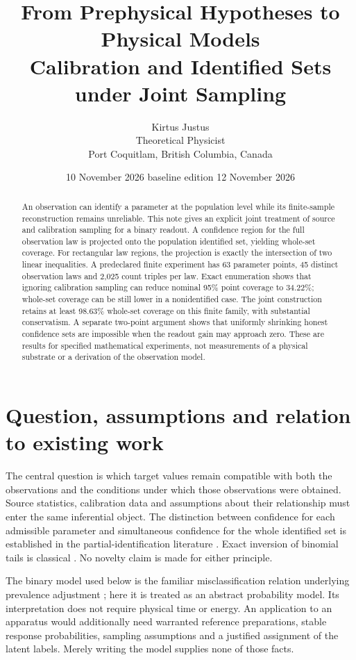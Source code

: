 \documentclass[11pt,a4paper]{article}
\title{\color{ink}\sffamily\large From Prephysical Hypotheses to Physical Models\\[9pt]\LARGE Calibration and Identified Sets under Joint Sampling}
\author{Kirtus Justus\\\small Theoretical Physicist\\\small Port Coquitlam, British Columbia, Canada}
\date{10 November 2026 \textperiodcentered{} baseline edition 12 November 2026}
\theoremstyle{definition}\newtheorem{definition}[theorem]{Definition}
\begin{document}
\maketitle
\begin{abstract}
An observation can identify a parameter at the population level while its finite-sample reconstruction remains unreliable. This note gives an explicit joint treatment of source and calibration sampling for a binary readout. A confidence region for the full observation law is projected onto the population identified set, yielding whole-set coverage. For rectangular law regions, the projection is exactly the intersection of two linear inequalities. A predeclared finite experiment has 63 parameter points, 45 distinct observation laws and 2,025 count triples per law. Exact enumeration shows that ignoring calibration sampling can reduce nominal 95\% point coverage to 34.22\%; whole-set coverage can be still lower in a nonidentified case. The joint construction retains at least 98.63\% whole-set coverage on this finite family, with substantial conservatism. A separate two-point argument shows that uniformly shrinking honest confidence sets are impossible when the readout gain may approach zero. These are results for specified mathematical experiments, not measurements of a physical substrate or a derivation of the observation model.
\end{abstract}
\begingroup
\setlength{\parskip}{0pt}
\tableofcontents
\endgroup
\newpage
\section{Question, assumptions and relation to existing work}

The central question is which target values remain compatible with both the observations and the conditions under which those observations were obtained. Source statistics, calibration data and assumptions about their relationship must enter the same inferential object. The distinction between confidence for each admissible parameter and simultaneous confidence for the whole identified set is established in the partial-identification literature \cite{imbens,romano}. Exact inversion of binomial tails is classical \cite{clopper}. No novelty claim is made for either principle.

The binary model used below is the familiar misclassification relation underlying prevalence adjustment \cite{rogan}; here it is treated as an abstract probability model. Its interpretation does not require physical time or energy. An application to an apparatus would additionally need warranted reference preparations, stable response probabilities, sampling assumptions and a justified assignment of the latent labels. Merely writing the model supplies none of those facts.
\end{document}
